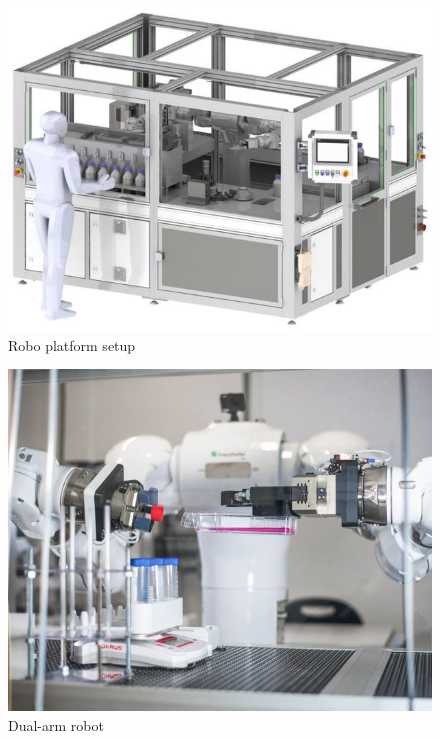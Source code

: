 \documentclass[12pt,twoside,a4paper,parskip]{scrbook} %
\begin{document}
\begin{figure}[H]
  \centering
  \includegraphics[scale=0.55]{figures/setup.jpg} %
  \caption{Robo platform setup}
  \label{fig:output1}
\end{figure}

\begin{figure}[H]
  \centering
  \includegraphics[scale=0.55]{figures/Robot.jpg} %
  \caption{Dual-arm robot}
  \label{fig:output1}
\end{figure}
\end{document}
